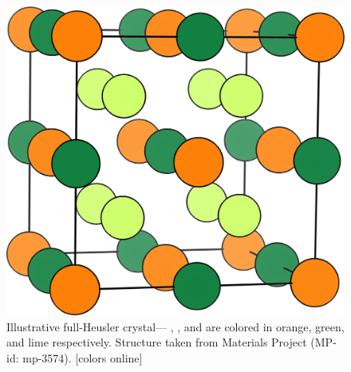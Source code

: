 \documentclass[article]{elsarticle}
\begin{document}
\begin{figure}[H]
    \centering
    \includegraphics[scale=0.30]{Figures/MnAlCu2.png}
    \caption{Illustrative full-Heusler crystal--- , , and  are colored in orange, green, and lime respectively. Structure taken from Materials Project\cite{Jain2013} (MP-id: mp-3574). [colors online]
    }
    \label{fig:HeuslersCrystalStructure}
\end{figure}
\end{document}

